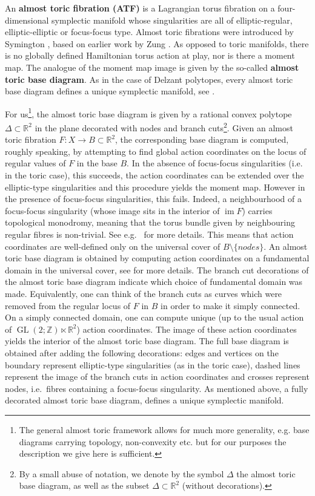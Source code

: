 \documentclass[12pt,a4paper,draft]{scrartcl}
\DeclareMathOperator{\im}{im}
\begin{document}
An \textbf{almost toric fibration (ATF)} is a Lagrangian torus fibration on a four-dimensional symplectic manifold whose singularities are all of elliptic-regular, elliptic-elliptic or focus-focus type. Almost toric fibrations were introduced by Symington \cite{symington2002FourDF}, based on earlier work by Zung \cite{Zun96,Zun97,Zun03}. As opposed to toric manifolds, there is no globally defined Hamiltonian torus action at play, nor is there a moment map. The analogue of the moment map image is given by the so-called \textbf{almost toric base diagram}. As in the case of Delzant polytopes, every almost toric base diagram defines a unique symplectic manifold, see \cite[Corollary 5.4]{symington2002FourDF} \cite[Theorem 8.5]{evans2021atfs}. 

For us\footnote{The general almost toric framework allows for much more generality, e.g. base diagrams carrying topology, non-convexity etc. but for our purposes the description we give here is sufficient.}, the almost toric base diagram is given by a rational convex polytope $\Delta \subset \mathbb{R}^2$ in the plane decorated with nodes and branch cuts\footnote{By a small abuse of notation, we denote by the symbol $\Delta$ the almost toric base diagram, as well as the subset $\Delta \subset \mathbb{R}^2$ (without decorations).}. Given an almost toric fibration $F \colon X \rightarrow B \subset \mathbb{R}^2$, the corresponding base diagram is computed, roughly speaking, by attempting to find global action coordinates on the locus of regular values of $F$ in the base $B$. In the absence of focus-focus singularities (i.e. in the toric case), this succeeds, the action coordinates can be extended over the elliptic-type singularities and this procedure yields the moment map. However in the presence of focus-focus singularities, this fails. Indeed, a neighbourhood of a focus-focus singularity (whose image sits in the interior of $\im F$) carries topological monodromy, meaning that the torus bundle given by neighbouring regular fibres is non-trivial. See e.g.\ \cite{Zun97} for more details. This means that action coordinates are well-defined only on the universal cover of $B \setminus \{nodes\}$. An almost toric base diagram is obtained by computing action coordinates on a fundamental domain in the universal cover, see \cite[Definition 8.3]{evans2021atfs} for more details. The branch cut decorations of the almost toric base diagram indicate which choice of fundamental domain was made. Equivalently, one can think of the branch cuts as curves which were removed from the regular locus of $F$ in $B$ in order to make it simply connected. On a simply connected domain, one can compute unique (up to the usual action of $\operatorname{GL}(2;\mathbb{Z}) \ltimes \mathbb{R}^2$) action coordinates. The image of these action coordinates yields the interior of the almost toric base diagram. The full base diagram is obtained after adding the following decorations: edges and vertices on the boundary represent elliptic-type singularities (as in the toric case), dashed lines represent the image of the branch cuts in action coordinates and crosses represent nodes, i.e.\ fibres containing a focus-focus singularity. As mentioned above, a fully decorated almost toric base diagram, defines a unique symplectic manifold.
\end{document}
